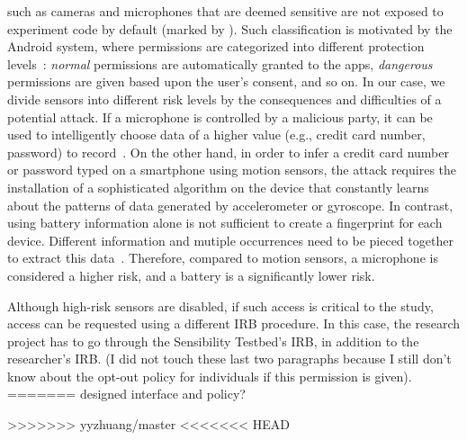 {such as cameras and microphones that are deemed sensitive are not 
exposed to experiment code by default (marked by \xmark). Such 
classification is motivated by the Android system, where 
permissions are categorized into different protection levels~\cite{level}:
\textit{normal} permissions are automatically granted to the apps, 
\textit{dangerous} permissions are given based upon the 
user's consent, and so on. In our case, 
we divide sensors into different risk levels by the consequences and 
difficulties of a potential attack. If a microphone is controlled by 
a malicious party, it can be used to intelligently choose data of a 
higher value (e.g., credit card number, password) to record~\cite{zhang2015leave}. On the other 
hand, in order to infer a credit card number or password typed on a 
smartphone using motion sensors, the attack requires the installation of 
a sophisticated algorithm on the device that constantly learns about  
the patterns of data generated by accelerometer or gyroscope. In contrast,
using battery information alone is not sufficient to create a fingerprint 
for each device. Different information and mutiple occurrences need to
be pieced together to extract this data~\cite{battery-priv}. Therefore, 
compared to motion sensors, a microphone is considered a higher risk, 
and a battery is a significantly lower risk.

Although high-risk sensors are disabled, if such access  is critical to the 
study, access can be requested using a different IRB procedure. 
In this case, the research project has to go through the Sensibility 
Testbed's IRB, in addition to the researcher's IRB. 
 \lois(I did not touch these last two paragraphs because I still don't know about  the opt-out policy for individuals if this permission is given).
=======
designed interface and policy?} 
>>>>>>> yyzhuang/master
%
%
<<<<<<< HEAD

